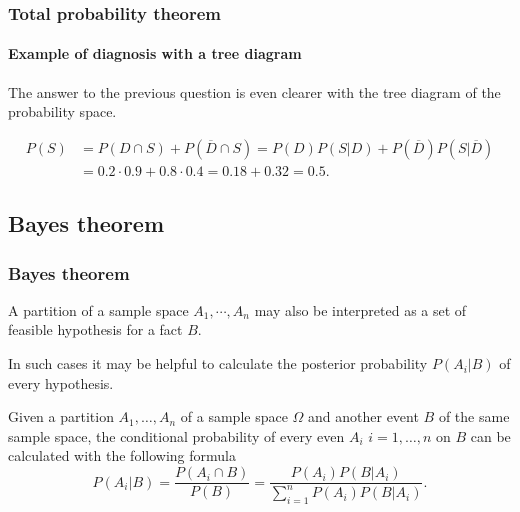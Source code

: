 \begin{frame}
\frametitle{Total probability theorem}
\framesubtitle{Example of diagnosis with a tree diagram}
The answer to the previous question is even clearer with the tree diagram of the probability space.

\begin{center}
\end{center}

\begin{align*}
P(S) &= P(D\cap S) + P(\overline D\cap S) = P(D)P(S|D)+P(\overline D)P(S|\overline D)\\
& = 0.2\cdot 0.9+ 0.8\cdot 0.4 = 0.18 + 0.32 = 0.5.
\end{align*}
\end{frame}


\subsection{Bayes theorem}

\begin{frame}
\frametitle{Bayes theorem}
A partition of a sample space $A_1,\cdots,A_n$ may also be interpreted as a set of feasible hypothesis for a fact $B$.

In such cases it may be helpful to calculate the posterior probability $P(A_i|B)$ of every hypothesis.

\begin{theorem}[Bayes]
Given a partition $A_1,\ldots,A_n$ of a sample space $\Omega$ and another event $B$ of the same sample space, the
conditional probability of every even $A_i$ $i=1,\ldots,n$ on $B$ can be calculated with the following formula
\[
P(A_i|B) = \frac{P(A_i\cap B)}{P(B)} = \frac{P(A_i)P(B|A_i)}{\sum_{i=1}^n P(A_i)P(B|A_i)}.
\]
\end{theorem}
\end{frame}


